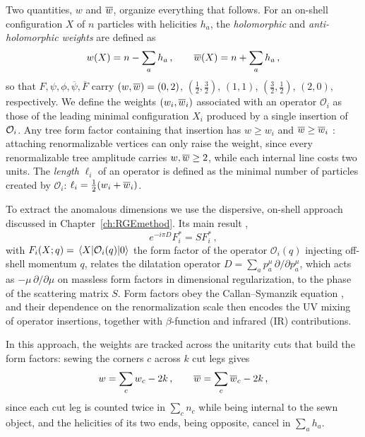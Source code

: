 Two quantities, $w$ and $\overline{w}$,
organize everything that follows.
For an on-shell configuration $X$ of $n$ particles with helicities $h_a$, the \textit{holomorphic} and \textit{anti-holomorphic
weights} \cite{Cheung:2015aba} are defined as
\begin{equation}
w(X)=n-\sum_a h_a \,,
\qquad
\overline{w}(X)=n+\sum_a h_a \,,
\label{eq:weights}
\end{equation}
so that $F,\psi,\phi,\overline\psi,\overline F$ carry $(w,\overline{w})=(0,2)$, $(\tfrac12,\tfrac32)$, $(1,1)$, $(\tfrac32,\tfrac12)$, $(2,0)$, respectively.
We define the weights $(w_i,\overline{w}_i)$ associated with an operator $\mathcal O_i$ as those of the leading
minimal configuration $X_i$ produced by a single insertion of $\mathcal{O}_i$.
Any tree form factor containing that insertion has $w\ge w_i$ and $\overline{w}\ge\overline{w}_i$ \cite{Cheung:2015aba}: attaching renormalizable vertices can only raise the weight, since every renormalizable tree amplitude
carries $w,\overline{w} \ge 2$, while each internal line costs two units.
The \textit{length} $\ell_i$ of an operator \cite{Bern:2019wie} is defined as the minimal number of particles created by $\mathcal O_i$: $\ell_i = \frac{1}{2}(w_i + \overline{w}_i)$.

To extract the anomalous dimensions we use the dispersive, on-shell approach discussed in Chapter~\ref{ch:RGEmethod}.
Its main result \cite{Caron-Huot:2016cwu},
\begin{equation}
    e^{-i\pi D} F_i^* = S F_i^*\,,
    \label{eq:chw}
\end{equation}
with $F_i(X;q) = \mel{X}{\mathcal O_i(q)}{0}$ the form factor of the operator $\mathcal O_i(q)$ injecting off-shell momentum $q$, relates the dilatation operator $D=\sum_a p_a^\mu \, \partial/\partial p_a^\mu$, which acts as $-\mu \, \partial/\partial\mu$ on massless form factors in dimensional regularization, to the phase of the scattering matrix $S$.
Form factors obey the Callan--Symanzik equation \cite{Callan:1970yg,Symanzik:1970rt},
and their dependence on the renormalization scale then encodes the UV mixing of operator insertions, together with $\beta$-function and infrared (IR) contributions.

In this approach, the weights are tracked across the unitarity cuts that build the form factors: sewing the corners $c$ across $k$ cut legs gives
\begin{equation}
\label{eq:sewing}
    w = \sum_c w_c - 2k\,,
    \qquad
    \overline{w} = \sum_c \overline{w}_c - 2k\,,
\end{equation}
since each cut leg is counted twice in $\sum_c n_c$ while being internal to the sewn object, and the helicities of its two ends, being opposite, cancel in $\sum_a h_a$.

